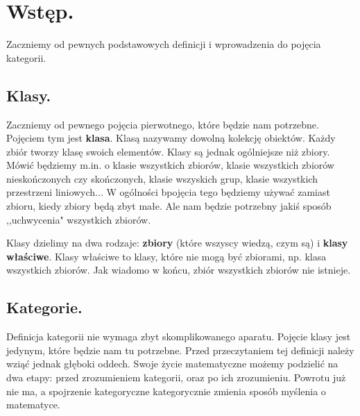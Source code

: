 \section{Wstęp.}

Zaczniemy od pewnych podstawowych definicji i wprowadzenia do pojęcia kategorii.

\subsection{Klasy.}

Zaczniemy od pewnego pojęcia pierwotnego,
które będzie nam potrzebne.
Pojęciem tym jest \textbf{klasa}.
Klasą nazywamy dowolną kolekcję obiektów.
Każdy zbiór tworzy klasę swoich elementów.
Klasy są jednak ogólniejsze niż zbiory.
Mówić będziemy m.in. o klasie wszystkich zbiorów,
klasie wszystkich zbiorów nieskończonych czy skończonych,
klasie wszyskich grup,
klasie wszystkich przestrzeni liniowych...
W ogólności bpojęcia tego będziemy używać zamiast zbioru,
kiedy zbiory będą zbyt małe.
Ale nam będzie potrzebny jakiś sposób ,,uchwycenia" wszystkich zbiorów.

Klasy dzielimy na dwa rodzaje: \textbf{zbiory} (które wszyscy wiedzą, czym są) i \textbf{klasy właściwe}.
Klasy właściwe to klasy,
które nie mogą być zbiorami,
np. klasa wszystkich zbiorów.
Jak wiadomo w końcu,
zbiór wszystkich zbiorów nie istnieje.

\subsection{Kategorie.}

Definicja kategorii nie wymaga zbyt skomplikowanego aparatu.
Pojęcie klasy jest jedynym,
które będzie nam tu potrzebne.
Przed przeczytaniem tej definicji należy wziąć jednak głęboki oddech.
Swoje życie matematyczne możemy podzielić na dwa etapy:
przed zrozumieniem kategorii,
oraz po ich zrozumieniu.
Powrotu już nie ma,
a spojrzenie kategoryczne kategorycznie zmienia sposób myślenia o matematyce.

